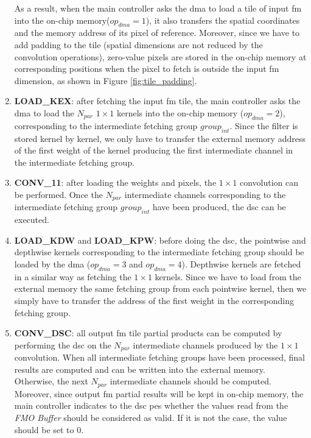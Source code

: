 \begin{enumerate}
    As a result, when the main controller asks the \acrshort{dma} to load a tile of input \acrshort{fm} into the on-chip memory($op_{dma} = 1$), it also transfers the spatial coordinates and the memory address of its pixel of reference. Moreover, since we have to add padding to the tile (spatial dimensions are not reduced by the convolution operations), zero-value pixels are stored in the on-chip memory at corresponding positions when the pixel to fetch is outside the input \acrshort{fm} dimension, as shown in Figure \ref{fig:tile_padding}.
    \item \textbf{LOAD\_KEX}: after fetching the input \acrshort{fm} tile, the main controller asks the \acrshort{dma} to load the $N_{par}$ $1 \times 1$ kernels into the on-chip memory ($op_{dma} = 2$), corresponding to the intermediate fetching group $group_{int}$. Since the filter is stored kernel by kernel, we only have to transfer the external memory address of the first weight of the kernel producing the first intermediate channel in the intermediate fetching group.
    \item \textbf{CONV\_11}: after loading the weights and pixels, the $1 \times 1$ convolution can be performed. Once the $N_{par}$ intermediate channels corresponding to the intermediate fetching group $group_{int}$ have been produced, the \acrshort{dsc} can be executed.
    \item \textbf{LOAD\_KDW} and \textbf{LOAD\_KPW}: before doing the \acrshort{dsc}, the pointwise and depthwise kernels corresponding to the intermediate fetching group should be loaded by the \acrshort{dma} ($op_{dma} = 3$ and $op_{dma} = 4$). Depthwise kernels are fetched in a similar way as fetching the $1 \times 1$ kernels. Since we have to load from the external memory the same fetching group from each pointwise kernel, then we simply have to transfer the address of the first weight in the corresponding fetching group. 
    \item \textbf{CONV\_DSC}: all output \acrshort{fm} tile partial products can be computed by performing the \acrshort{dsc} on the $N_{par}$ intermediate channels produced by the $1 \times 1 $ convolution. When all intermediate fetching groups have been processed, final results are computed and can be written into the external memory. Otherwise, the next $N_{par}$ intermediate channels should be computed. Moreover, since output \acrshort{fm} partial results will be kept in on-chip memory, the main controller indicates to the \acrshort{dsc} \acrshort{pe}s whether the values read from the \textit{FMO Buffer} should be considered as valid. If it is not the case, the value should be set to 0.

\end{enumerate}
